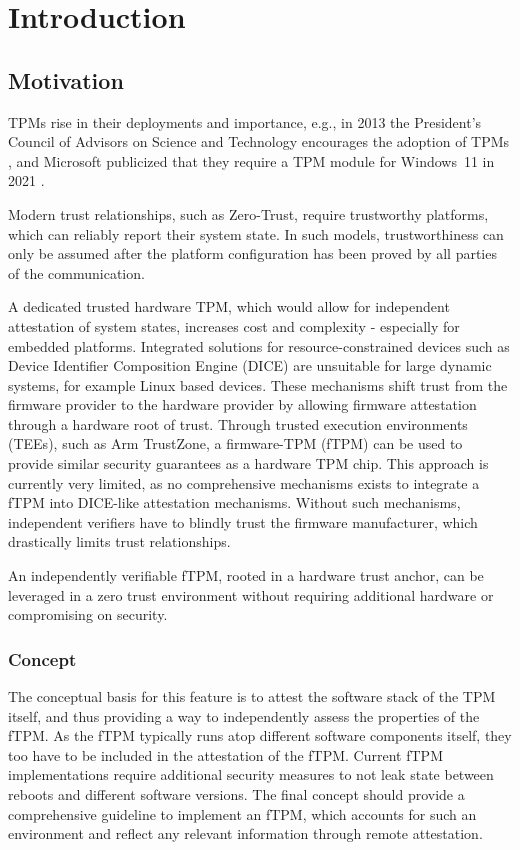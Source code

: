 
\chapter{Introduction}\label{chapter:introduction}

\section{Motivation}

TPMs rise in their deployments and importance, e.g., in 2013 the President's Council of Advisors on Science and Technology encourages the adoption of TPMs \cite{usa}, and Microsoft publicized that they require a TPM module for Windows~11 in 2021 \cite{win11req}.

Modern trust relationships, such as Zero-Trust, require trustworthy platforms, which can reliably report their system state.
In such models, trustworthiness can only be assumed after the platform configuration has been proved by all parties of the communication.

A dedicated trusted hardware TPM, which would allow for independent attestation of system states, increases cost and complexity - especially for embedded platforms.
Integrated solutions for resource-constrained devices such as Device Identifier Composition Engine (DICE) are unsuitable for large dynamic systems, for example Linux based devices.
These mechanisms shift trust from the firmware provider to the hardware provider by allowing firmware attestation through a hardware root of trust.
Through trusted execution environments (TEEs), such as Arm TrustZone, a firmware-TPM (fTPM) can be used to provide similar security guarantees as a hardware TPM chip.
This approach is currently very limited, as no comprehensive mechanisms exists to integrate a fTPM into DICE-like attestation mechanisms.
Without such mechanisms, independent verifiers have to blindly trust the firmware manufacturer, which drastically limits trust relationships.

An independently verifiable fTPM, rooted in a hardware trust anchor, can be leveraged in a
zero trust environment without requiring additional hardware or compromising on security.

\subsection{Concept}
The conceptual basis for this feature is to attest the software stack of the TPM itself, and thus providing a way to independently assess the properties of the fTPM.
As the fTPM typically runs atop different software components itself, they too have to be included in the attestation of the fTPM.
Current fTPM implementations require additional security measures to not leak state between reboots and different software versions.
The final concept should provide a comprehensive guideline to implement an fTPM, which accounts for such an environment and reflect any relevant information through remote attestation.

